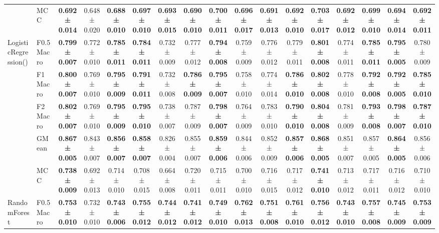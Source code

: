 \begin{table}[H]
{\begin{tabular}{llccccccccccccccc}
 & MCC & \textbf{0.692 ± 0.014} & 0.648 ± 0.020 & \textbf{0.688 ± 0.010} & \textbf{0.697 ± 0.010} & \textbf{0.693 ± 0.015} & \textbf{0.690 ± 0.010} & \textbf{0.700 ± 0.011} & \textbf{0.696 ± 0.017} & \textbf{0.691 ± 0.013} & \textbf{0.692 ± 0.010} & \textbf{0.703 ± 0.017} & \textbf{0.692 ± 0.012} & \textbf{0.699 ± 0.010} & \textbf{0.694 ± 0.014} & \textbf{0.692 ± 0.011} \\
\cline{1-17}
\multirow[t]{5}{*}{LogisticRegression()} & F0.5 Macro & \textbf{0.799 ± 0.007} & 0.772 ± 0.010 & \textbf{0.785 ± 0.011} & \textbf{0.784 ± 0.011} & 0.732 ± 0.009 & 0.777 ± 0.012 & \textbf{0.794 ± 0.008} & 0.759 ± 0.009 & 0.776 ± 0.012 & 0.779 ± 0.011 & \textbf{0.801 ± 0.008} & 0.774 ± 0.011 & \textbf{0.785 ± 0.011} & \textbf{0.795 ± 0.005} & 0.780 ± 0.009 \\
 & F1 Macro & \textbf{0.800 ± 0.007} & 0.769 ± 0.010 & \textbf{0.795 ± 0.009} & \textbf{0.791 ± 0.011} & 0.732 ± 0.008 & \textbf{0.786 ± 0.009} & \textbf{0.795 ± 0.007} & 0.758 ± 0.010 & 0.774 ± 0.014 & \textbf{0.786 ± 0.010} & \textbf{0.802 ± 0.008} & 0.778 ± 0.010 & \textbf{0.792 ± 0.008} & \textbf{0.792 ± 0.005} & \textbf{0.785 ± 0.010} \\
 & F2 Macro & \textbf{0.802 ± 0.007} & 0.769 ± 0.010 & \textbf{0.795 ± 0.009} & \textbf{0.795 ± 0.010} & 0.738 ± 0.007 & 0.787 ± 0.009 & \textbf{0.798 ± 0.007} & 0.764 ± 0.009 & 0.783 ± 0.010 & \textbf{0.790 ± 0.010} & \textbf{0.804 ± 0.008} & 0.781 ± 0.009 & \textbf{0.793 ± 0.008} & \textbf{0.798 ± 0.007} & \textbf{0.787 ± 0.010} \\
 & GMean & \textbf{0.867 ± 0.005} & 0.843 ± 0.007 & \textbf{0.856 ± 0.007} & \textbf{0.858 ± 0.007} & 0.826 ± 0.004 & 0.855 ± 0.007 & \textbf{0.859 ± 0.006} & 0.844 ± 0.006 & 0.852 ± 0.009 & \textbf{0.857 ± 0.006} & \textbf{0.868 ± 0.005} & 0.851 ± 0.007 & 0.857 ± 0.005 & \textbf{0.864 ± 0.005} & 0.856 ± 0.006 \\
 & MCC & \textbf{0.738 ± 0.009} & 0.692 ± 0.013 & 0.714 ± 0.010 & 0.708 ± 0.015 & 0.664 ± 0.008 & 0.720 ± 0.011 & 0.715 ± 0.011 & 0.700 ± 0.010 & 0.716 ± 0.015 & 0.717 ± 0.012 & \textbf{0.741 ± 0.010} & 0.713 ± 0.012 & 0.717 ± 0.011 & 0.716 ± 0.012 & 0.710 ± 0.010 \\
\cline{1-17}
\multirow[t]{5}{*}{RandomForest} & F0.5 Macro & \textbf{0.753 ± 0.010} & 0.732 ± 0.010 & \textbf{0.743 ± 0.006} & \textbf{0.755 ± 0.012} & \textbf{0.744 ± 0.012} & \textbf{0.741 ± 0.012} & \textbf{0.749 ± 0.010} & \textbf{0.762 ± 0.013} & \textbf{0.751 ± 0.008} & \textbf{0.761 ± 0.010} & \textbf{0.756 ± 0.012} & \textbf{0.743 ± 0.010} & \textbf{0.757 ± 0.008} & \textbf{0.745 ± 0.009} & \textbf{0.753 ± 0.009} \\

\end{tabular}}
\end{table}
